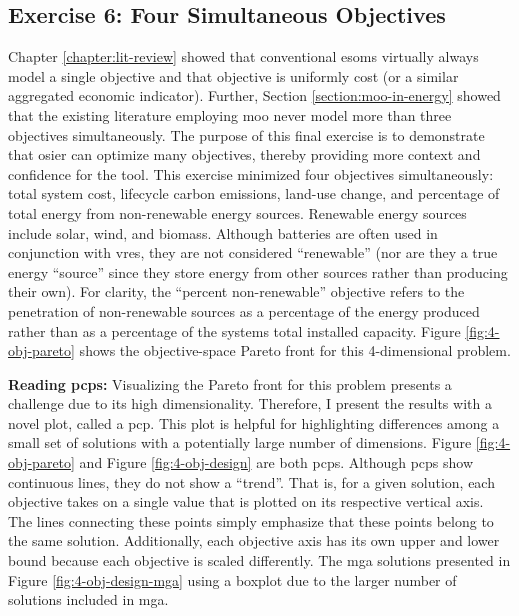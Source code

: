 \subsection{Exercise 6: Four Simultaneous Objectives}
\label{section:four-obj-results}
Chapter \ref{chapter:lit-review} showed that conventional \acp{esom} virtually
always model a single objective and that objective is uniformly cost (or a
similar aggregated economic indicator). Further, Section
\ref{section:moo-in-energy} showed that the existing literature employing
\ac{moo} never model more than three objectives simultaneously. The purpose of
this final exercise is to demonstrate that \ac{osier} can optimize many
objectives, thereby providing more context and confidence for the tool. This
exercise minimized four objectives simultaneously: total system cost, lifecycle
carbon emissions, land-use change, and percentage of total energy from
non-renewable energy sources. Renewable energy sources include solar, wind, and
biomass. Although batteries are often used in conjunction with \acp{vre}, they
are not considered ``renewable'' (nor are they a true energy ``source'' since
they store energy from other sources rather than producing their own). For
clarity, the ``percent non-renewable'' objective refers to the penetration of
non-renewable sources as a percentage of the energy produced rather than as a
percentage of the systems total installed capacity. Figure
\ref{fig:4-obj-pareto} shows the objective-space Pareto front for this
4-dimensional problem.

\begin{noteBox}
\textbf{Reading \aclp{pcp}:} Visualizing the Pareto front for this problem
presents a challenge due to its high dimensionality. Therefore, I present the
results with a novel plot, called a \ac{pcp}. This plot is helpful for
highlighting differences among a small set of solutions with a potentially large
number of dimensions. Figure \ref{fig:4-obj-pareto} and Figure
\ref{fig:4-obj-design} are both \acp{pcp}. Although \acp{pcp} show continuous
lines, they do not show a ``trend''. That is, for a given solution, each
objective takes on a single value that is plotted on its respective vertical
axis. The lines connecting these points simply emphasize that these points
belong to the same solution. Additionally, each objective axis has its own upper
and lower bound because each objective is scaled differently. The \ac{mga}
solutions presented in Figure \ref{fig:4-obj-design-mga} using a boxplot due to
the larger number of solutions included in \ac{mga}. 
\end{noteBox}


